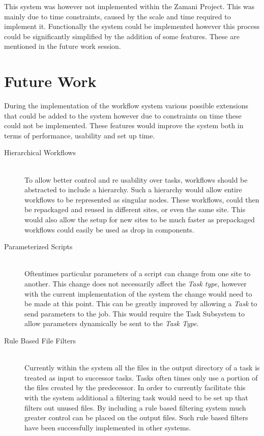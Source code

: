 This system was however not implemented within the Zamani Project. This was
mainly due to time constraints, caused by the scale and time required to
implement it. Functionally the system could be implemented however this process
could be significantly simplified by the addition of some features. These are
mentioned in the future work session.


\section{Future Work}
During the implementation of the workflow system various possible extensions
that could be added to the system however due to constraints on time these could
not be implemented. These features would improve the system both in terms of
performance, usability and set up time. 
\begin{description}
\item[Hierarchical Workflows]\hfill \\
To allow better control and re usability over tasks, workflows should be
abstracted to include a hierarchy. Such a hierarchy would allow entire workflows
to be represented as singular nodes. These workflows, could then be repackaged
and reused in different sites, or even the same site. This would also allow the
setup for new sites to be much faster as prepackaged workflows could easily be
used as drop in components.
\item[Parameterized Scripts]\hfill \\
Oftentimes particular parameters of a script can change from one site to
another. This change does not necessarily affect the \emph{Task type}, however
with the current implementation of the system the change would need to be made
at this point. This can be greatly improved by allowing a \emph{Task} to send
parameters to the job. This would require the Task Subsystem to allow parameters
dynamically be sent to the \emph{Task Type}.
\item[Rule Based File Filters]\hfill \\
Currently within the system all the files in the output directory of a task is
treated as input to successor tasks. Tasks often times only use a portion of the
files created by the predecessor. In order to currently facilitate this with the
system additional a filtering task would need to be set up that filters out
unused files. By including a rule based filtering system much greater control
can be placed on the output files. Such rule based filters have been
successfully implemented in other systems\cite{conery2005rule}.

\end{description}
